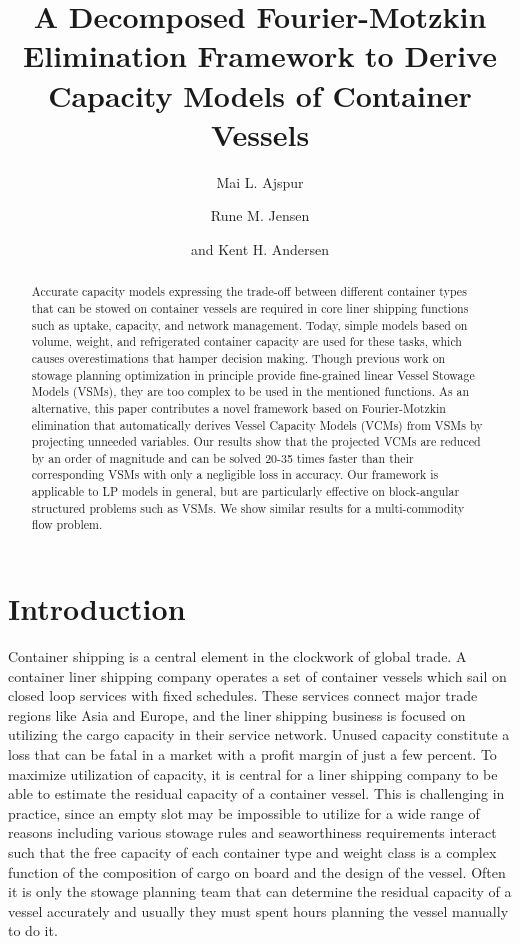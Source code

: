\documentclass{llncs}
\begin{document}
\title{A Decomposed Fourier-Motzkin Elimination Framework to Derive Capacity Models of Container Vessels}
\author{Mai L. Ajspur \and Rune M. Jensen \and and Kent H. Andersen}

\maketitle

\begin{abstract}
Accurate capacity models expressing the trade-off between different container types that can be stowed
on container vessels are required in core liner shipping functions such as uptake, capacity, and network management. Today, simple models based on volume, weight, and refrigerated container capacity are used for these tasks, which causes overestimations that hamper decision making.
Though previous work on stowage planning optimization in principle provide fine-grained linear Vessel Stowage Models (VSMs), they are too complex to be used in the mentioned functions. 
As an alternative, this paper contributes a novel framework based on Fourier-Motzkin
elimination that automatically derives Vessel Capacity Models (VCMs) from VSMs by projecting unneeded
variables. Our results show that the projected VCMs are reduced by an order of magnitude and can be solved 20-35 times faster than their corresponding VSMs with only a negligible loss in accuracy. 
Our framework is applicable to LP models in general, but are particularly effective on block-angular structured problems such as VSMs. We show similar results for a multi-commodity flow problem.
\end{abstract}

\section{Introduction}
Container shipping is a central element in the clockwork of global trade. A container liner shipping company operates a set of container vessels which sail on closed loop services with fixed schedules. These services connect major trade regions like Asia and Europe, and the liner shipping business is focused on utilizing the cargo capacity in their service network. Unused capacity constitute a loss that can be fatal in a market with a profit margin of just a few percent.  
To maximize utilization of capacity, it is central for a liner shipping company to be able to estimate the residual capacity of a container vessel. This is challenging in practice, since an empty slot may be impossible to utilize for a wide range of reasons including various stowage rules and seaworthiness requirements interact such that the free capacity of each container type and weight class is a complex function of the composition of cargo on board and the design of the vessel. Often it is only the stowage planning team that can determine the residual capacity of a vessel accurately and usually they must spent hours planning the vessel manually to do it. 
\end{document}
